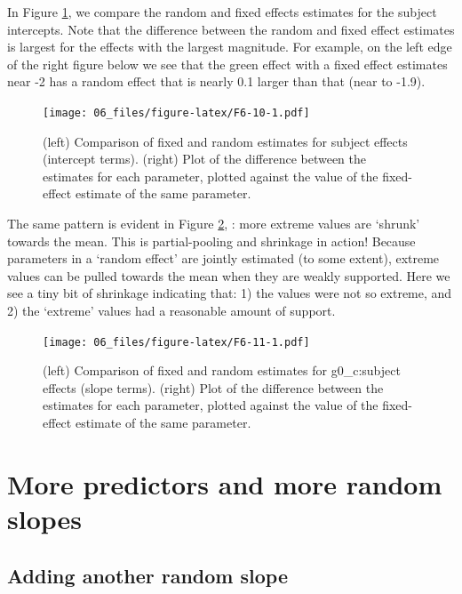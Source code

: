 \documentclass[
]{book}
\begin{document}
In Figure \ref{fig:F6-10}, we compare the random and fixed effects estimates for the subject intercepts. Note that the difference between the random and fixed effect estimates is largest for the effects with the largest magnitude. For example, on the left edge of the right figure below we see that the green effect with a fixed effect estimates near -2 has a random effect that is nearly 0.1 larger than that (near to -1.9).

\begin{figure}
\centering
\texttt{[image: 06\_files/figure-latex/F6-10-1.pdf]}
\caption{\label{fig:F6-10}(left) Comparison of fixed and random estimates for subject effects (intercept terms). (right) Plot of the difference between the estimates for each parameter, plotted against the value of the fixed-effect estimate of the same parameter.}
\end{figure}

The same pattern is evident in Figure \ref{fig:F6-11}, : more extreme values are `shrunk' towards the mean. This is partial-pooling and shrinkage in action! Because parameters in a `random effect' are jointly estimated (to some extent), extreme values can be pulled towards the mean when they are weakly supported. Here we see a tiny bit of shrinkage indicating that: 1) the values were not so extreme, and 2) the `extreme' values had a reasonable amount of support.

\begin{figure}
\centering
\texttt{[image: 06\_files/figure-latex/F6-11-1.pdf]}
\caption{\label{fig:F6-11}(left) Comparison of fixed and random estimates for g0\_c:subject effects (slope terms). (right) Plot of the difference between the estimates for each parameter, plotted against the value of the fixed-effect estimate of the same parameter.}
\end{figure}

\hypertarget{more-predictors-and-more-random-slopes}{%
\section{More predictors and more random slopes}\label{more-predictors-and-more-random-slopes}}

\hypertarget{adding-another-random-slope}{%
\subsection{Adding another random slope}\label{adding-another-random-slope}}
\end{document}
